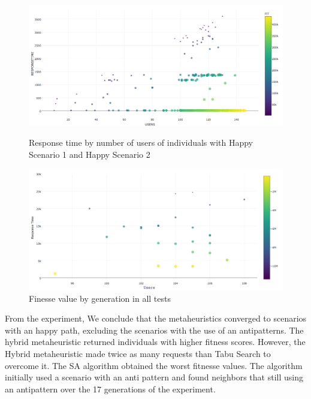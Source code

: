 \documentclass[times]{stvrauth}
\begin{document}
\begin{figure}[h]
\begin{minipage}{.5\textwidth}
\centering
\includegraphics[width=1\textwidth]{./images/experiment1-7.png}
\caption{Response time by number of users of individuals with Happy Scenario 1 and Happy Scenario 2}
\label{fig:responsetimegenerationalltests1}
\end{minipage}
\begin{minipage}{.5\textwidth}
\centering
\includegraphics[width=1\textwidth]{./images/experiment1-8.png}
\caption{Finesse value by generation in all tests}
\label{fig:fitnessegenerationalltests1-1}
\end{minipage}
\end{figure}

From the experiment, We conclude that the metaheuristics converged to scenarios with an happy path, excluding the scenarios with the use of an antipatterns. The hybrid metaheuristic returned individuals with higher fitness scores. However, the Hybrid metaheuristic made twice as many requests than Tabu Search to overcome it. The SA algorithm obtained the worst fitnesse values. The algorithm initially used a scenario with an anti pattern and found neighbors that still using an antipattern over the 17 generations of the experiment.
\end{document}

